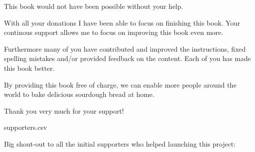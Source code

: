 This book would not have been possible without your help.

With all your donations I have been able to focus on finishing
this book. Your continous support allows me to focus
on improving this book even more.

Furthermore many of you have contributed and improved the
instructions, fixed spelling mistakes and/or provided
feedback on the content. Each of you has made this book
better.

By providing this book free of charge,
we can enable more people around the world to bake delicious sourdough
bread at home.

Thank you very much for your support!\\

\begin{filecontents}{supporters.csv}
  \end{filecontents}

  {Big shout-out to all the initial supporters who helped launching this project:}



